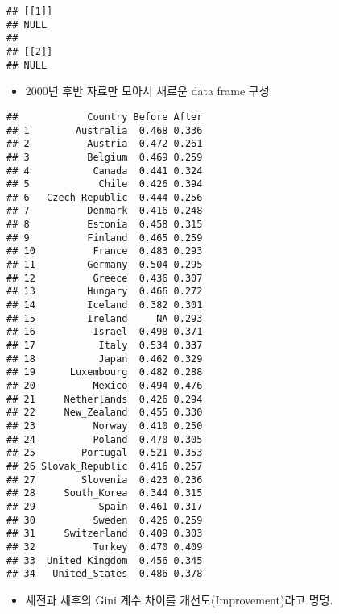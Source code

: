 \documentclass[
]{article}
\newenvironment{Shaded}{\begin{snugshade}}{\end{snugshade}}
\newcommand{\AttributeTok}[1]{\textcolor[rgb]{0.77,0.63,0.00}{#1}}
\newcommand{\FunctionTok}[1]{\textcolor[rgb]{0.00,0.00,0.00}{#1}}
\newcommand{\NormalTok}[1]{#1}
\newcommand{\OtherTok}[1]{\textcolor[rgb]{0.56,0.35,0.01}{#1}}
\newcommand{\SpecialCharTok}[1]{\textcolor[rgb]{0.00,0.00,0.00}{#1}}
\providecommand{\tightlist}{%
  \setlength{\itemsep}{0pt}\setlength{\parskip}{0pt}}
\begin{document}
\begin{verbatim}
## [[1]]
## NULL
## 
## [[2]]
## NULL
\end{verbatim}

\begin{itemize}
\tightlist
\item
  2000년 후반 자료만 모아서 새로운 data frame 구성
\end{itemize}

\begin{Shaded}
\end{Shaded}

\begin{verbatim}
##            Country Before After
## 1        Australia  0.468 0.336
## 2          Austria  0.472 0.261
## 3          Belgium  0.469 0.259
## 4           Canada  0.441 0.324
## 5            Chile  0.426 0.394
## 6   Czech_Republic  0.444 0.256
## 7          Denmark  0.416 0.248
## 8          Estonia  0.458 0.315
## 9          Finland  0.465 0.259
## 10          France  0.483 0.293
## 11         Germany  0.504 0.295
## 12          Greece  0.436 0.307
## 13         Hungary  0.466 0.272
## 14         Iceland  0.382 0.301
## 15         Ireland     NA 0.293
## 16          Israel  0.498 0.371
## 17           Italy  0.534 0.337
## 18           Japan  0.462 0.329
## 19      Luxembourg  0.482 0.288
## 20          Mexico  0.494 0.476
## 21     Netherlands  0.426 0.294
## 22     New_Zealand  0.455 0.330
## 23          Norway  0.410 0.250
## 24          Poland  0.470 0.305
## 25        Portugal  0.521 0.353
## 26 Slovak_Republic  0.416 0.257
## 27        Slovenia  0.423 0.236
## 28     South_Korea  0.344 0.315
## 29           Spain  0.461 0.317
## 30          Sweden  0.426 0.259
## 31     Switzerland  0.409 0.303
## 32          Turkey  0.470 0.409
## 33  United_Kingdom  0.456 0.345
## 34   United_States  0.486 0.378
\end{verbatim}

\begin{itemize}
\tightlist
\item
  세전과 세후의 Gini 계수 차이를 개선도(Improvement)라고 명명.
\end{itemize}
\end{document}
